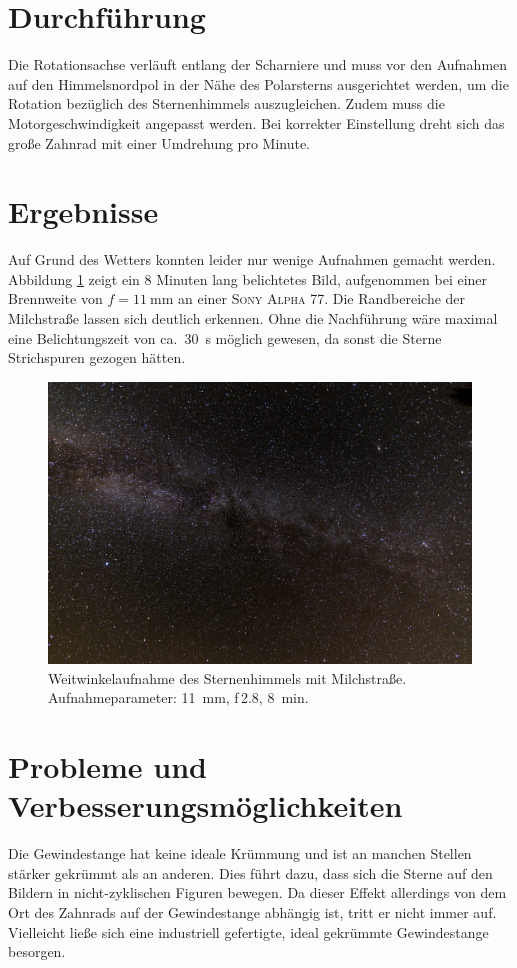\section{Durchführung}
Die Rotationsachse verläuft entlang der Scharniere und muss vor den Aufnahmen auf den Himmelsnordpol in der Nähe des Polarsterns ausgerichtet werden, um die Rotation bezüglich des Sternenhimmels auszugleichen. 
Zudem muss die Motorgeschwindigkeit angepasst werden. 
Bei korrekter Einstellung dreht sich das große Zahnrad mit einer Umdrehung pro Minute.

\section{Ergebnisse}
Auf Grund des Wetters konnten leider nur wenige Aufnahmen gemacht werden. 
Abbildung \ref{fig:milkyway} zeigt ein \num{8} Minuten lang belichtetes Bild, aufgenommen bei einer Brennweite von $f=\SI{11}{\milli\meter}$ an einer \textsc{Sony Alpha 77}. 
Die Randbereiche der Milchstraße lassen sich deutlich erkennen.
Ohne die Nachführung wäre maximal eine Belichtungszeit von ca.\ \SI{30}{\second} möglich gewesen, da sonst die Sterne Strichspuren gezogen hätten.
\begin{figure}
  \centering
  \includegraphics[width=\linewidth]{images/milkyway.jpg}
  \caption{Weitwinkelaufnahme des Sternenhimmels mit Milchstraße. Aufnahmeparameter: \SI{11}{\milli\metre}, f\,\num{2.8}, \SI{8}{\minute}.}
  \label{fig:milkyway}
\end{figure}

\section{Probleme und Verbesserungsmöglichkeiten}
Die Gewindestange hat keine ideale Krümmung und ist an manchen Stellen stärker gekrümmt als an anderen. 
Dies führt dazu, dass sich die Sterne auf den Bildern in nicht-zyklischen Figuren bewegen. 
Da dieser Effekt allerdings von dem Ort des Zahnrads auf der Gewindestange abhängig ist, tritt er nicht immer auf.
Vielleicht ließe sich eine industriell gefertigte, ideal gekrümmte Gewindestange besorgen.

